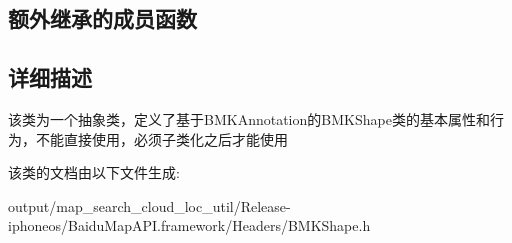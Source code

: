 \subsection*{额外继承的成员函数}


\subsection{详细描述}
该类为一个抽象类，定义了基于\+B\+M\+K\+Annotation的\+B\+M\+K\+Shape类的基本属性和行为，不能直接使用，必须子类化之后才能使用 

该类的文档由以下文件生成\+:\begin{DoxyCompactItemize}
\item 
output/map\+\_\+search\+\_\+cloud\+\_\+loc\+\_\+util/\+Release-\/iphoneos/\+Baidu\+Map\+A\+P\+I.\+framework/\+Headers/B\+M\+K\+Shape.\+h\end{DoxyCompactItemize}
